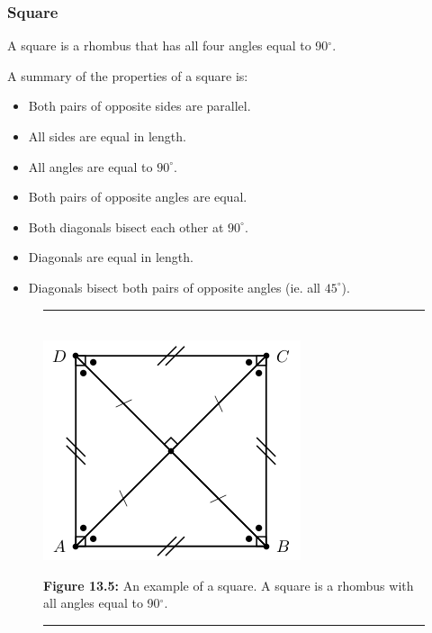 \subsubsection{ Square}
A square is a rhombus that has all four angles equal to 90$^{\circ }$.\par 
A summary of the properties of a square is:\par 
\begin{itemize}[noitemsep]
\item Both pairs of opposite sides are parallel.
\item All sides are equal in length.
\item All angles are equal to ${90}^{\circ }$.
\item Both pairs of opposite angles are equal.
\item Both diagonals bisect each other at ${90}^{\circ }$.
\item Diagonals are equal in length.
\item Diagonals bisect both pairs of opposite angles (ie. all ${45}^{\circ }$).
\end{itemize}
\setcounter{subfigure}{0}
\begin{figure}[H] %
\begin{center}
\rule[.1in]{\figurerulewidth}{.005in} \\
\label{m39354*uid84!!!underscore!!!media}\label{m39354*uid84!!!underscore!!!printright prismsimage}\includegraphics{col11306.imgs/m39354_MG10C13_044.png} %
\vspace{2pt}
\vspace{\rubberspace}\par \begin{cnxcaption}
\small \textbf{Figure 13.5: }An example of a square. A square is a rhombus with all angles equal to 90$^{\circ }$.
\end{cnxcaption}
\vspace{.1in}
\rule[.1in]{\figurerulewidth}{.005in} \\
\end{center}
\end{figure}       

